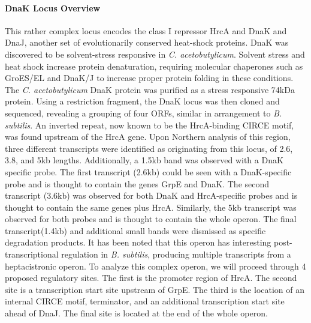 \paragraph{DnaK Locus Overview}
This rather complex locus encodes the class I repressor HrcA and DnaK and DnaJ, another set of evolutionarily conserved heat-shock proteins. DnaK was discovered to be solvent-stress responsive in \textit{C. acetobutylicum}\cite{74,75}. Solvent stress and heat shock increase protein denaturation, requiring molecular chaperones such as GroES/EL and DnaK/J to increase proper protein folding in these conditions. The \textit{C. acetobutylicum} DnaK protein was purified as a stress responsive 74kDa protein\cite{75}. Using a restriction fragment, the DnaK locus was then cloned and sequenced\cite{80}, revealing a grouping of four ORFs, similar in arrangement to \textit{B. subtilis}\cite{77}. An inverted repeat, now known to be the HrcA-binding CIRCE motif, was found upstream of the HrcA gene\cite{80}. Upon Northern analysis of this region, three different transcripts were identified as originating from this locus, of 2.6, 3.8, and 5kb lengths. Additionally, a 1.5kb band was observed with a DnaK specific probe\cite{80}. The first transcript (2.6kb) could be seen with a DnaK-specific probe and is thought to contain the genes GrpE and DnaK. The second transcript (3.6kb) was observed for both DnaK and HrcA-specific probes and is thought to contain the same genes plus HrcA. Similarly, the 5kb transcript was observed for both probes and is thought to contain the whole operon. The final transcript(1.4kb) and additional small bands were dismissed as specific degradation products. It has been noted that this operon has interesting post-transcriptional regulation in \textit{B. subtilis}, producing multiple transcripts from a heptacistronic operon\cite{81}. To analyze this complex operon, we will proceed through 4 proposed regulatory sites. The first is the promoter region of HrcA. The second site is a transcription start site upstream of GrpE. The third is the location of an internal CIRCE motif, terminator, and an additional transcription start site ahead of DnaJ. The final site is located at the end of the whole operon.

